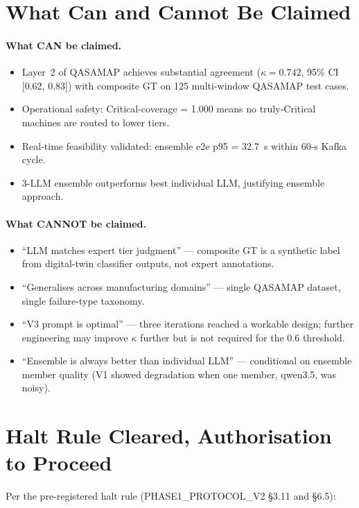\section{What Can and Cannot Be Claimed}

\paragraph{What CAN be claimed.}
\begin{itemize}
    \item Layer~2 of QASAMAP achieves substantial agreement ($\kappa = 0.742$, 95\% CI [0.62, 0.83]) with composite GT on 125 multi-window QASAMAP test cases.
    \item Operational safety: Critical-coverage = 1.000 means no truly-Critical machines are routed to lower tiers.
    \item Real-time feasibility validated: ensemble e2e p95 = 32.7~s within 60-s Kafka cycle.
    \item 3-LLM ensemble outperforms best individual LLM, justifying ensemble approach.
\end{itemize}

\paragraph{What CANNOT be claimed.}
\begin{itemize}
    \item ``LLM matches expert tier judgment'' --- composite GT is a synthetic label from digital-twin classifier outputs, not expert annotations.
    \item ``Generalises across manufacturing domains'' --- single QASAMAP dataset, single failure-type taxonomy.
    \item ``V3 prompt is optimal'' --- three iterations reached a workable design; further engineering may improve $\kappa$ further but is not required for the 0.6 threshold.
    \item ``Ensemble is always better than individual LLM'' --- conditional on ensemble member quality (V1 showed degradation when one member, qwen3.5, was noisy).
\end{itemize}

\section{Halt Rule Cleared, Authorisation to Proceed}

Per the pre-registered halt rule (PHASE1\_PROTOCOL\_V2 §3.11 and §6.5):

